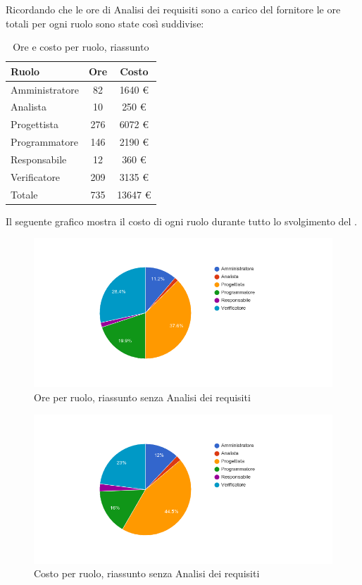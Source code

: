 Ricordando che le ore di Analisi dei requisiti sono a carico del fornitore le ore totali per ogni ruolo sono state così suddivise:
\begin{table}[H]
	\centering
	\begin{tabular}{ l c c }
		\textbf{Ruolo} & \textbf{Ore} & \textbf{Costo} \\
		\hline
		Amministratore & 82 & 1640 \euro{} \\
		Analista & 10 & 250 \euro{} \\
		Progettista & 276 & 6072 \euro{} \\
		Programmatore & 146 & 2190 \euro{} \\
		Responsabile & 12 & 360 \euro{} \\
		Verificatore & 209 & 3135 \euro{} \\
		\hline
		Totale & 735 & 13647 \euro{} \\
		\hline
	\end{tabular}
	\caption{Ore e costo per ruolo, riassunto }
\end{table}

Il seguente grafico mostra il costo di ogni ruolo durante tutto lo svolgimento del .

\begin{figure}[H]
  \begin{center}
    \includegraphics[width=15cm]{res/img/prospettoEconomico/orePerRuoloRiassuntoSenzaAnalisi.png}
  \caption{Ore per ruolo, riassunto  senza Analisi dei requisiti}
  \end{center} 
\end{figure}  

\begin{figure}[H]
  \begin{center}
    \includegraphics[width=15cm]{res/img/prospettoEconomico/costoPerRuoloRiassuntoSenzaAnalisi.png}
  \caption{Costo per ruolo, riassunto  senza Analisi dei requisiti}
  \end{center} 
\end{figure}  

\newpage